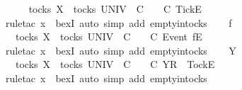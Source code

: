 \begin{isabellebody}
\isamarkupfalse%
\isanewline
\ \ \isamarkupfalse%
\ {\isachardoublequoteopen}{\isacharbrackleft}{\isacharbrackright}\ {\isasymin}\ tocks\ X\ {\isasymLongrightarrow}\ {\isasymexists}{\isasymrho}{\isasymin}tocks\ UNIV{\isachardot}\ {\isacharbrackleft}{\isacharbrackright}\ {\isasymsubseteq}\isactrlsub C\ {\isasymrho}\ {\isasymand}\ {\isasymrho}\ {\isasymle}\isactrlsub C\ {\isacharbrackleft}{\isacharbrackleft}Tick{\isacharbrackright}\isactrlsub E{\isacharbrackright}{\isachardoublequoteclose}\ \ \isanewline
\ \ \ \ \isamarkupfalse%
\ {\isacharparenleft}rule{\isacharunderscore}tac\ x{\isacharequal}{\isachardoublequoteopen}{\isacharbrackleft}{\isacharbrackright}{\isachardoublequoteclose}\ \ bexI{\isacharcomma}\ auto\ simp\ add{\isacharcolon}\ empty{\isacharunderscore}in{\isacharunderscore}tocks{\isacharparenright}\isanewline
{}\isamarkupfalse%
\isanewline
\ \ \isamarkupfalse%
\ f\ {\isasymsigma}\isanewline
\ \ \isamarkupfalse%
\ {\isachardoublequoteopen}{\isacharbrackleft}{\isacharbrackright}\ {\isasymin}\ tocks\ X\ {\isasymLongrightarrow}\ {\isasymexists}{\isasymrho}{\isasymin}tocks\ UNIV{\isachardot}\ {\isacharbrackleft}{\isacharbrackright}\ {\isasymsubseteq}\isactrlsub C\ {\isasymrho}\ {\isasymand}\ {\isasymrho}\ {\isasymle}\isactrlsub C\ {\isacharbrackleft}Event\ f{\isacharbrackright}\isactrlsub E\ {\isacharhash}\ {\isasymsigma}{\isachardoublequoteclose}\isanewline
\ \ \ \ \isamarkupfalse%
\ {\isacharparenleft}rule{\isacharunderscore}tac\ x{\isacharequal}{\isachardoublequoteopen}{\isacharbrackleft}{\isacharbrackright}{\isachardoublequoteclose}\ \ bexI{\isacharcomma}\ auto\ simp\ add{\isacharcolon}\ empty{\isacharunderscore}in{\isacharunderscore}tocks{\isacharparenright}\isanewline
{}\isamarkupfalse%
\isanewline
\ \ \isamarkupfalse%
\ Y\ {\isasymsigma}\isanewline
\ \ \isamarkupfalse%
\ {\isachardoublequoteopen}{\isacharbrackleft}{\isacharbrackright}\ {\isasymin}\ tocks\ X\ {\isasymLongrightarrow}\ {\isasymexists}{\isasymrho}{\isasymin}tocks\ UNIV{\isachardot}\ {\isacharbrackleft}{\isacharbrackright}\ {\isasymsubseteq}\isactrlsub C\ {\isasymrho}\ {\isasymand}\ {\isasymrho}\ {\isasymle}\isactrlsub C\ {\isacharbrackleft}Y{\isacharbrackright}\isactrlsub R\ {\isacharhash}\ {\isacharbrackleft}Tock{\isacharbrackright}\isactrlsub E\ {\isacharhash}\ {\isasymsigma}{\isachardoublequoteclose}\isanewline
\ \ \ \ \isamarkupfalse%
\ {\isacharparenleft}rule{\isacharunderscore}tac\ x{\isacharequal}{\isachardoublequoteopen}{\isacharbrackleft}{\isacharbrackright}{\isachardoublequoteclose}\ \ bexI{\isacharcomma}\ auto\ simp\ add{\isacharcolon}\ empty{\isacharunderscore}in{\isacharunderscore}tocks{\isacharparenright}\isanewline

\end{isabellebody}
